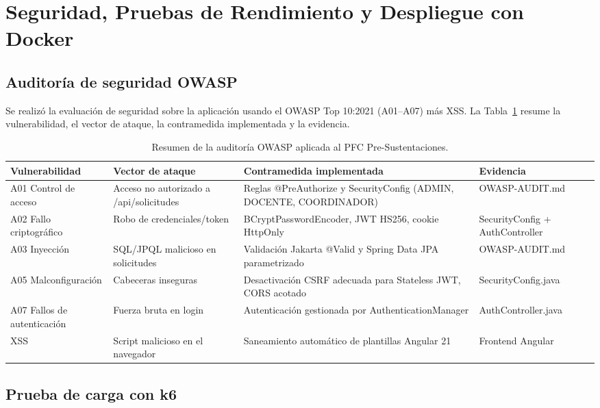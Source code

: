 \section{Seguridad, Pruebas de Rendimiento y Despliegue con Docker}
\subsection{Auditoría de seguridad OWASP}

Se realizó la evaluación de seguridad sobre la aplicación usando el OWASP Top 10:2021 (A01--A07) más XSS. La
Tabla~\ref{tab:owasp} resume la vulnerabilidad, el vector de ataque, la contramedida implementada y la evidencia.

\begin{table}[H]
\centering
\footnotesize
\setlength{\tabcolsep}{4pt}
\begin{tabular}{@{}p{2.4cm}p{2.9cm}p{3.3cm}p{2.6cm}@{}}
\toprule
\textbf{Vulnerabilidad} & \textbf{Vector de ataque} & \textbf{Contramedida implementada} & \textbf{Evidencia} \\
\midrule
A01 Control de acceso & Acceso no autorizado a /api/solicitudes & Reglas @PreAuthorize y SecurityConfig (ADMIN, DOCENTE, COORDINADOR) & OWASP-AUDIT.md \\
A02 Fallo criptográfico & Robo de credenciales/token & BCryptPasswordEncoder, JWT HS256, cookie HttpOnly & SecurityConfig + AuthController \\
A03 Inyección & SQL/JPQL malicioso en solicitudes & Validación Jakarta @Valid y Spring Data JPA parametrizado & OWASP-AUDIT.md \\
A05 Malconfiguración & Cabeceras inseguras & Desactivación CSRF adecuada para Stateless JWT, CORS acotado & SecurityConfig.java \\
A07 Fallos de autenticación & Fuerza bruta en login & Autenticación gestionada por AuthenticationManager & AuthController.java \\
XSS & Script malicioso en el navegador & Saneamiento automático de plantillas Angular 21 & Frontend Angular \\
\bottomrule
\end{tabular}
\caption{Resumen de la auditoría OWASP aplicada al PFC Pre-Sustentaciones.}
\label{tab:owasp}
\end{table}

\subsection{Prueba de carga con k6}

